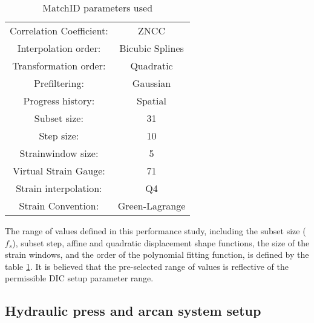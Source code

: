 \begin{table}[]
	\centering
	\begin{tabular}{c c}
		\hline
		Correlation   Coefficient: & ZNCC \\ 
		Interpolation order: & Bicubic Splines \\ 
		Transformation order: & Quadratic \\
		Prefiltering: & Gaussian \\
		Progress history: & Spatial \\
		Subset size: & 31 \\
		Step size: & 10 \\
		Strainwindow size: & 5 \\ 
		Virtual Strain Gauge: & 71 \\
		Strain interpolation: & Q4 \\ 
		Strain Convention: & Green-Lagrange \\ \hline
	\end{tabular}
	\caption{MatchID parameters used}
	\label{tab:MatchID_param}
\end{table}

The range of values defined in this performance study, including the subset size ($f_s$), subset step, affine and quadratic displacement shape functions, the size of the strain windows, and the order of the polynomial fitting function, is defined by the table \ref{tab:MatchID_param}. It is believed that the pre-selected range of values is reflective of the permissible DIC setup parameter range.

\subsection{Hydraulic press and arcan system setup}


